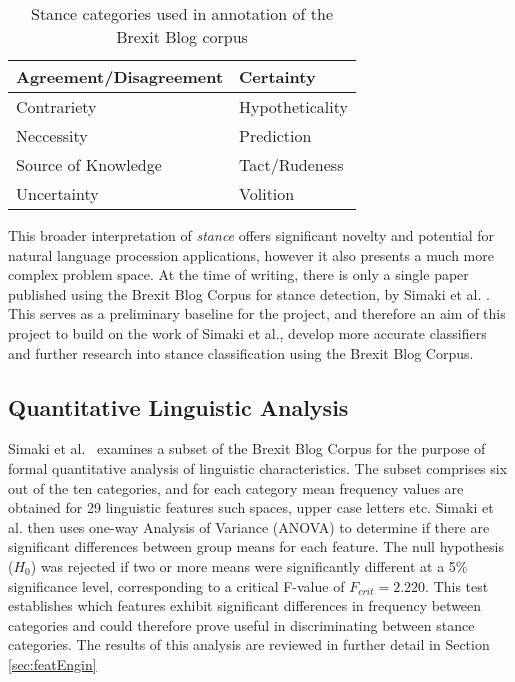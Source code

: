 \documentclass[Dissertation.tex]{subfiles}
\begin{document}
{\renewcommand{\arraystretch}{1.5}
	
	\begin{table}[h]
		\caption{Stance categories used in annotation of the Brexit Blog corpus \cite{simakiAnnotatingSpeakerStance2017}}
		\label{tab:stanceCats}
		\small\scshape 
		\centering
		\begin{tabular}{|l|l|}
			\hline
			Agreement/Disagreement & Certainty       \\ \hline
			Contrariety            & Hypotheticality \\ \hline
			Neccessity             & Prediction      \\ \hline
			Source of Knowledge    & Tact/Rudeness   \\ \hline
			Uncertainty            & Volition        \\ \hline
		\end{tabular}
		
\end{table}}

This broader interpretation of \textit{stance} offers significant novelty and potential for natural language procession applications, however it also presents a much more complex problem space. At the time of writing, there is only a single paper published using the Brexit Blog Corpus for stance detection, by Simaki et al. \cite{simakiStanceClassificationTexts2017}. This serves as a preliminary baseline for the project, and therefore an aim of this project to build on the work of Simaki et al., develop more accurate classifiers and further research into stance classification using the Brexit Blog Corpus.

\subsection{Quantitative Linguistic Analysis}\label{sec:quantAnalysis}
Simaki et al.\ \cite{simakiEvaluatingStanceannotatedSentences2018} examines a subset of the Brexit Blog Corpus for the purpose of formal quantitative analysis of linguistic characteristics. The subset comprises six out of the ten categories, and for each category mean frequency values are obtained for 29 linguistic features such spaces, upper case letters etc. Simaki et al.\cite{simakiEvaluatingStanceannotatedSentences2018} then uses one-way Analysis of Variance (ANOVA) to determine if there are significant differences between group means for each feature. The null hypothesis ($ H_0 $) was rejected if two or more means were significantly different at a 5\% significance level, corresponding to a critical F-value of $ F_{crit} =2.220 $. This test establishes which features exhibit significant differences in frequency between categories and could therefore prove useful in discriminating between stance categories. The results of this analysis are reviewed in further detail in Section \ref{sec:featEngin}
\end{document}
